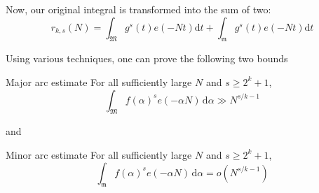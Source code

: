 \begin{frame}
Now, our original integral is transformed into the sum of two:
\[
  r_{k, s}(N) = \int_{\mathfrak{M}} g^s(t)e(-Nt)\mathrm{d}t + \int_{\mathfrak{m}} g^s(t)e(-Nt)\mathrm{d}t
\]
\pause

Using various techniques, one can prove the following two bounds
\begin{exampleblock}{Major arc estimate}
	For all sufficiently large \(N\) and \(s \geq 2^k + 1\),
\[
  \int_{\mathfrak{M}} f(\alpha)^s e(-\alpha N)\, \mathrm{d}\alpha \gg N^{s / k - 1}
\]
\end{exampleblock}

\noindent
and

\begin{exampleblock}{Minor arc estimate}
	For all sufficiently large \(N\) and \(s \geq 2^k + 1\),
\[
  \int_{\mathfrak{m}} f(\alpha)^s e(-\alpha N)\, \mathrm{d}\alpha = o\left(N^{s / k - 1}\right)
\]
\end{exampleblock}
\end{frame}
